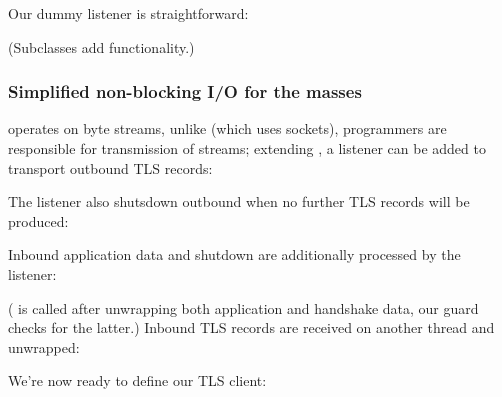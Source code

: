 

\noindent
Our dummy listener is straightforward:



\noindent
(Subclasses add functionality.)



\subsubsection{Simplified non-blocking I/O for the masses}

 operates on byte streams, unlike  (which uses sockets), 
programmers are responsible for transmission of streams; extending , 
a listener can be added to transport outbound TLS records:



\noindent 
The listener also shutsdown outbound when no further TLS records will be produced:



\noindent
Inbound application data and shutdown are additionally processed by the listener:



\noindent
( is called after unwrapping both application and
handshake data, our guard checks for the latter.) 
%
Inbound TLS records are received on another thread and unwrapped:



\noindent
We're now ready to define our TLS client:



